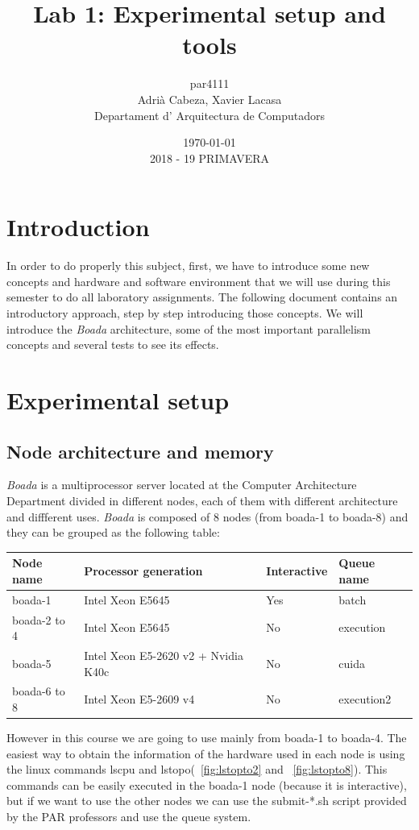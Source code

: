\documentclass[12]{article}
\author{par4111 \\ Adrià Cabeza, Xavier Lacasa \\ Departament d' Arquitectura de Computadors}
\title{Lab 1: Experimental setup and tools}
\date{\today \\ 2018 - 19 PRIMAVERA}
\begin{document}
\maketitle
\newpage
\tableofcontents
\newpage
\section{Introduction}
In order to do properly this subject, first, we have to introduce some new concepts and hardware and software environment that we will use during this semester to do all laboratory assignments.  The following document contains an introductory approach, step by step introducing those concepts. We will introduce the \textit{Boada} architecture, some of the most important parallelism concepts and several tests to see its effects. 

\section{Experimental setup}
\subsection{Node architecture and memory}

\textit{Boada} is a multiprocessor server located at the Computer Architecture Department divided in different nodes, each of them with different architecture and diffferent uses. \textit{Boada} is composed of 8 nodes (from boada-1 to boada-8) and they can be grouped as the following table: 
\\
\begin{table}[h]
\begin{tabular}{|l|l|l|l|}
\hline
Node name    & Processor generation                & Interactive & Queue name \\ \hline
boada-1      & Intel Xeon E5645                    & Yes         & batch      \\
boada-2 to 4 & Intel Xeon E5645                    & No          & execution  \\
boada-5      & Intel Xeon E5-2620 v2 + Nvidia K40c & No          & cuida      \\
boada-6 to 8 & Intel Xeon E5-2609 v4               & No          & execution2 \\ \hline
\end{tabular}
\end{table}

However in this course we are going to use mainly from boada-1 to boada-4. The easiest way to obtain the information of the hardware used in each node is using the linux commands lscpu and lstopo(~\ref{fig:lstopto2} and ~\ref{fig:lstopto8}). This commands can be easily executed in the boada-1 node (because it is interactive), but if we want to use the other nodes we can use the submit-*.sh script provided by the PAR professors and use the queue system. \\
\medskip
\end{document}
